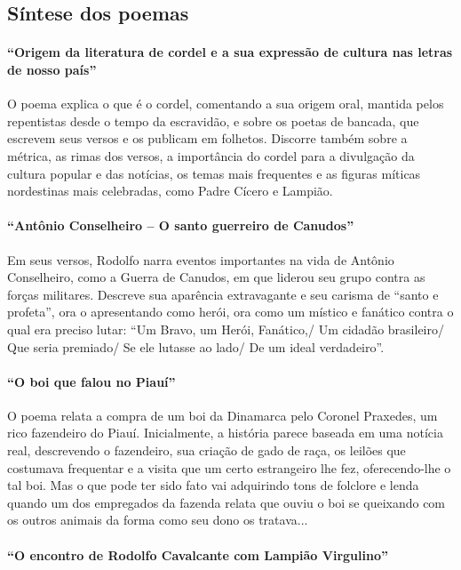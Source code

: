 \subsection{Síntese dos poemas}

\paragraph{“Origem da literatura de cordel e a sua expressão de cultura nas letras
de nosso país”}

O poema explica o que é o cordel, comentando a sua origem oral, mantida
pelos repentistas desde o tempo da escravidão, e sobre os poetas de
bancada, que escrevem seus versos e os publicam em folhetos. Discorre
também sobre a métrica, as rimas dos versos, a importância do cordel
para a divulgação da cultura popular e das notícias, os temas mais
frequentes e as figuras míticas nordestinas mais celebradas, como Padre
Cícero e Lampião.

\paragraph{“Antônio Conselheiro – O santo guerreiro de Canudos”}

Em seus versos, Rodolfo narra eventos importantes na vida de Antônio
Conselheiro, como a Guerra de Canudos, em que liderou seu grupo contra
as forças militares. Descreve sua aparência extravagante e seu carisma
de “santo e profeta”, ora o apresentando como herói, ora como um
místico e fanático contra o qual era preciso lutar: “Um Bravo, um
Herói, Fanático,/ Um cidadão brasileiro/ Que seria premiado/ Se ele
lutasse ao lado/ De um ideal verdadeiro”.

\paragraph{“O boi que falou no Piauí”}

O poema relata a compra de um boi da Dinamarca pelo Coronel Praxedes, um
rico fazendeiro do Piauí. Inicialmente, a história parece baseada em
uma notícia real, descrevendo o fazendeiro, sua criação de gado de
raça, os leilões que costumava frequentar e a visita que um certo
estrangeiro lhe fez, oferecendo-lhe o tal boi. Mas o que pode ter sido
fato vai adquirindo tons de folclore e lenda quando um dos empregados
da fazenda relata que ouviu o boi se queixando com os outros animais da
forma como seu dono os tratava...

\paragraph{“O encontro de Rodolfo Cavalcante com Lampião Virgulino”}

